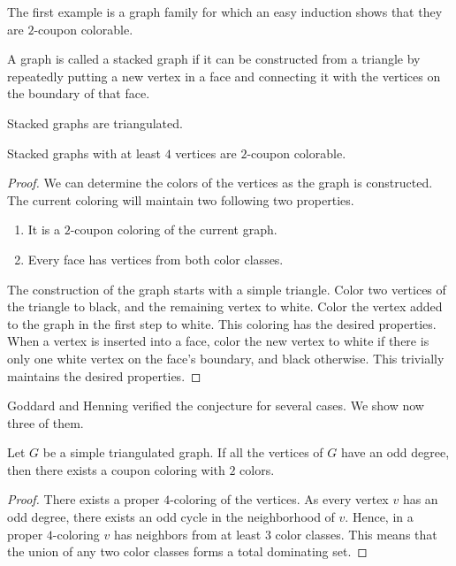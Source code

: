 The first example is a graph family for which an easy induction shows that they
are $2$-coupon colorable.

\begin{definition}
  A graph is called a stacked graph if it can be constructed from a triangle by
  repeatedly putting a new vertex in a face and connecting it with the vertices on
  the boundary of that face.
\end{definition}
\begin{remark}
  Stacked graphs are triangulated.
\end{remark}
\begin{claim}
  Stacked graphs with at least $4$ vertices are $2$-coupon colorable.
\end{claim}
\begin{proof}
  We can determine the colors of the vertices as the graph is constructed. The
  current coloring will maintain two following two properties.
  \begin{enumerate}
    \item It is a $2$-coupon coloring of the current graph.
    \item Every face has vertices from both color classes.
  \end{enumerate}
  The construction of the graph starts with a simple triangle. Color two vertices
  of the triangle to black, and the remaining vertex to white. Color the vertex added
  to the graph in the first step to white. This coloring has the desired properties.
  When a vertex is inserted into a face, color the new vertex to white if there is
  only one white vertex on the face's boundary, and black otherwise. This trivially
  maintains the desired properties.
\end{proof}

Goddard and Henning \cite{gh} verified the conjecture for several cases. We show now three
of them.

\begin{claim} \label{c:odd}
  Let $G$ be a simple triangulated graph. If all the
  vertices of $G$ have an odd degree, then there exists a coupon coloring with $2$ colors.
\end{claim}
\begin{proof}
  There exists a proper $4$-coloring of the vertices. As every vertex $v$ has an
  odd degree, there exists an odd cycle in the neighborhood of $v$. Hence, in a proper
  $4$-coloring $v$ has neighbors from at least $3$ color classes. This means that
  the union of any two color classes forms a total dominating set.
\end{proof}

